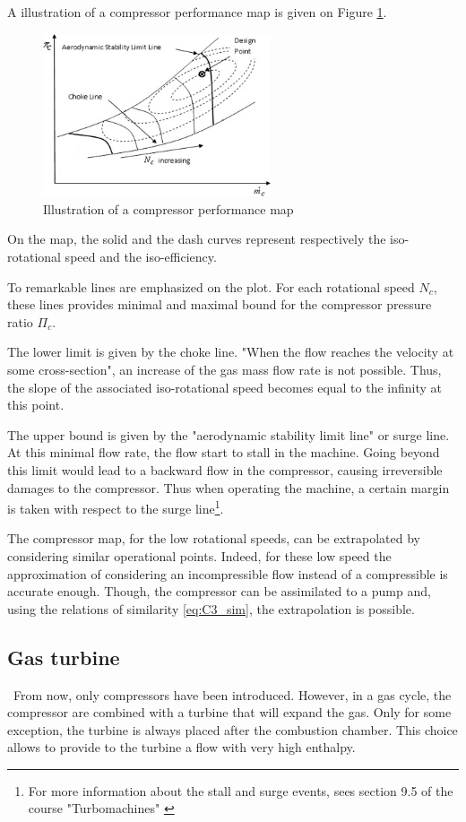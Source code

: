 A illustration of a compressor performance map is given on Figure \ref{fig:C3_compmap}.
\begin{figure}[h]
\centering
\includegraphics[width=0.6\textwidth]{Comp_Map.png}
\caption{Illustration of a compressor performance map \citep{Ghorbanian2009}}
\label{fig:C3_compmap}
\end{figure}  

On the map, the solid and the dash curves represent respectively the iso-rotational speed and the iso-efficiency.

To remarkable lines are emphasized on the plot. For each rotational speed $N_c$, these lines provides minimal and maximal bound for the compressor pressure ratio $\Pi_c$. 

The lower limit is given by the choke line. "When the flow reaches the velocity at some cross-section"\citep{Ghorbanian2009}, an increase of the gas mass flow rate is not possible. Thus, the slope of the associated iso-rotational speed becomes equal to the infinity at this point. 

The upper bound is given by the "aerodynamic stability limit line" or surge line. At this minimal flow rate, the flow start to stall in the machine. Going beyond this limit would lead to a backward flow in the compressor, causing irreversible damages to the compressor. Thus when operating the machine, a certain margin is taken with respect to the surge line\footnote{For more information about the stall and surge events, sees section 9.5 of the course "Turbomachines" \citep{Hillewaert2019}}.

The compressor map, for the low rotational speeds, can be extrapolated by considering similar operational points. Indeed, for these low speed the approximation of considering an incompressible flow instead of a compressible is accurate enough. Though, the compressor can be assimilated to a pump and, using the relations of similarity \ref{eq:C3_sim}, the extrapolation is possible. 
\subsection{Gas turbine}
\quad\, From now, only compressors have been introduced. However, in a gas cycle, the compressor are combined with a turbine that will expand the gas. Only for some exception, the turbine is always placed after the combustion chamber. This choice allows to provide to the turbine a flow with very high enthalpy.

